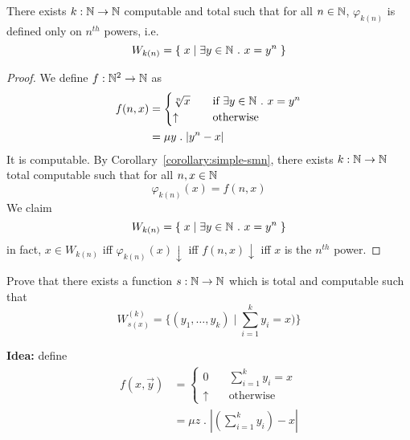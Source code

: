\begin{example}
  There exists $k : \mathbb{N} \to \mathbb{N}$ computable and total such that for all $n \in \mathbb{N}$,
  $\varphi_{k(n)}$ is defined only on $n^{th}$
  powers, i.e.
  \[
    W_{k(n)} = \{ \; x \; | \; \exists y \in \mathbb{N} \ . \ x = y^n \; \}
  \]
\begin{proof}
We define $f : \mathbb{N}^2 \rightarrow \mathbb{N}$ as
  \begin{align*}
    f(n,x) &= \begin{cases}
      \sqrt[n]{x} & \quad \mbox{if } \exists y \in \mathbb{N} \ . \ x = y^n \\
      \uparrow &\quad \mbox{otherwise}
    \end{cases} \\
    & = \mu y \; . \; |y^n-x|
  \end{align*}
  It is computable. By Corollary~\ref{corollary:simple-smn}, there exists $k: \mathbb{N} \to \mathbb{N}$ total computable such that for all $n, x \in \mathbb{N}$
  \[
    \varphi_{k(n)}(x) = f(n,x)
  \]
  We claim 
  \[
    W_{k(n)} = \{ \; x \; | \; \exists y \in \mathbb{N} \ . \ x = y^n \; \}
  \]
  in fact, $x \in W_{k(n)}$ iff
  $\varphi_{k(n)}(x)\downarrow$ iff $f(n,x)\downarrow$ iff $x$ is the
  $n^{th}$ power.
\end{proof}
\end{example}

\begin{exercise}
  Prove that there exists a function $s: \mathbb{N} \to \mathbb{N}$ which is total and computable
  such that
  \[W_{s(x)}^{(k)} = \{(y_1, \dots, y_k) \; | \;
    \sum\limits_{i=1}^ky_i = x)\}\]

  \textbf{Idea:} define
  \begin{align*}
    f(x, \vec{y}) &=
      \begin{cases}
        0 & \quad \sum_{i=1}^ky_i = x \\
        \uparrow & \quad \mbox{otherwise}
      \end{cases} \\
      &= \mu z \; . \; \left|\left(\sum_{i=1}^ky_i\right) - x\right|
  \end{align*}
\end{exercise}

